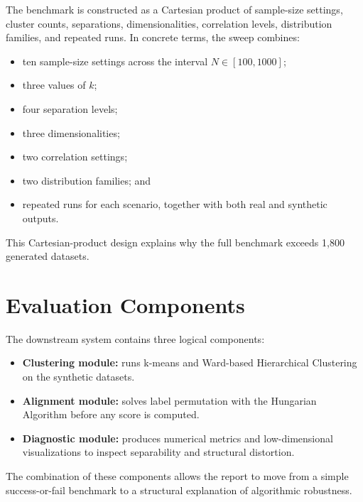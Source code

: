 The benchmark is constructed as a Cartesian product of sample-size settings, cluster counts, separations, dimensionalities, correlation levels, distribution families, and repeated runs. In concrete terms, the sweep combines:
\begin{itemize}
  \item ten sample-size settings across the interval $N \in [100, 1000]$;
  \item three values of $k$;
  \item four separation levels;
  \item three dimensionalities;
  \item two correlation settings;
  \item two distribution families; and
  \item repeated runs for each scenario, together with both real and synthetic outputs.
\end{itemize}

This Cartesian-product design explains why the full benchmark exceeds 1,800 generated datasets.

\section{Evaluation Components}
\label{sec:evaluation-components}

The downstream system contains three logical components:
\begin{itemize}
  \item \textbf{Clustering module:} runs k-means and Ward-based Hierarchical Clustering on the synthetic datasets.
  \item \textbf{Alignment module:} solves label permutation with the Hungarian Algorithm \cite{kuhn1955} before any score is computed.
  \item \textbf{Diagnostic module:} produces numerical metrics and low-dimensional visualizations to inspect separability and structural distortion.
\end{itemize}

The combination of these components allows the report to move from a simple success-or-fail benchmark to a structural explanation of algorithmic robustness.

